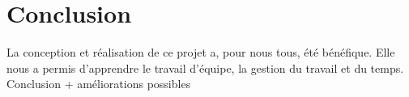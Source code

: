 \chapter{Conclusion}

\par La conception et réalisation de ce projet a, pour nous tous, été bénéfique. Elle nous a permis d'apprendre le travail d'équipe, la gestion du travail et du temps.
Conclusion + améliorations possibles